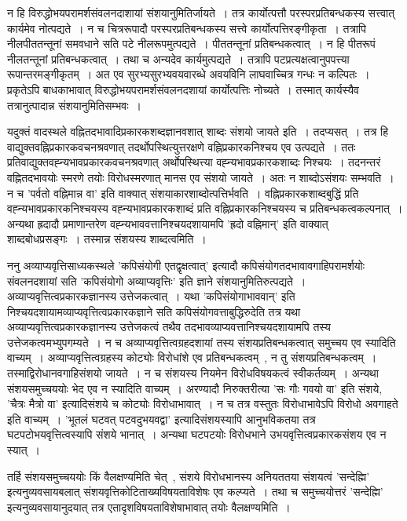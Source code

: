 		न हि विरुद्धोभयपरामर्शसंवलनदाशायां संशयानुमितिर्जायते~। तत्र कार्योत्पत्तौ परस्परप्रतिबन्धकस्य सत्त्वात् कार्यमेव नोत्पद्यते~। न च चित्ररूपादौ परस्परप्रतिबन्धकस्य सत्त्वे कार्योत्पत्तिरङ्गीकृता~। तत्रापि नीलपीततन्तूनां समवधाने सति पटे नीलरूपमुत्पद्यते~। पीततन्तूनां प्रतिबन्धकत्वात्~। न हि पीतरूपं नीलतन्तूनां प्रतिबन्धकत्वात्~। तथा च अन्यदेव कार्यमुत्पद्यते~। तत्रापि पटप्रत्यक्षत्वानुपपत्त्या रूपान्तरमङ्गीकृतम्~। अत एव सुरभ्यसुरभ्यवयवारब्धे अवयविनि लाघवाच्चित्र गन्धः न कल्पितः~। प्रकृतेऽपि बाधकाभावात् विरुद्धोभयपरामर्शसंवलनदशायां कार्योत्पत्तिः नोच्यते~। तस्मात् कार्यस्यैव तत्रानुत्पादान्न संशयानुमितिसम्भवः~।

		यदुक्तं वादस्थले वह्नितदभावादिप्रकारकशब्दज्ञानवशात् शाब्दः संशयो जायते इति~। तदप्यसत्~। तत्र हि वाद्युक्तवह्निप्रकारकवचनश्रवणात् तदर्थोपस्थित्युत्तरक्षणे वह्निप्रकारकनिश्चय एव उत्पद्यते~। ततः प्रतिवाद्युक्तवह्न्यभावप्रकारकवचनश्रवणात् अर्थोपस्थित्त्या वह्न्यभावप्रकारकशाब्दः निश्चयः~। तदनन्तरं वह्नितदभावयोः स्मरणे तयोः विरोधस्मरणात् मानस एव संशयो जायते~। अतः न शाब्दोऽसंशयः सम्भवति~। न च 'पर्वतो वह्निमान्न वा' इति वाक्यात् संशयाकारशाब्दोत्पत्तिर्भवति~। वह्निप्रकारकशाब्दबुद्धिं प्रति वह्न्यभावप्रकारकनिश्चयस्य वह्न्यभावप्रकारकशाब्दं प्रति वह्निप्रकारकनिश्चयस्य च प्रतिबन्धकत्वकल्पनात्~। अन्यथा  ह्रदादौ प्रमाणान्तरेण वह्न्यभाववत्तानिश्चयदशायामपि 'ह्रदो वह्निमान्' इति वाक्यात् शाब्दबोधप्रसङ्गः~। तस्मान्न संशयस्य शाब्दत्वमिति~।

		ननु अव्याप्यवृत्तिसाध्यकस्थले 'कपिसंयोगी एतद्वृक्षत्वात्' इत्यादौ कपिसंयोगतदभावावगाहिपरामर्शयोः संवलनदशायां सति 'कपिसंयोगो अव्याप्यवृत्तिः' इति ज्ञाने संशयानुमितिरुत्पद्यते~। अव्याप्यवृत्तित्वप्रकारकज्ञानस्य उत्तेजकत्वात्~। यथा 'कपिसंयोगाभाववान्' इति निश्चयदशायामव्याप्यवृत्तित्वप्रकारकज्ञाने सति कपिसंयोगवत्ताबुद्धिरुदेति तत्र यथा अव्याप्यवृत्तित्वप्रकारकज्ञानस्य उत्तेजकत्वं तथैव तदभावव्याप्यवत्तानिश्चयदशायामपि तस्य उत्तेजकत्वमभ्युपगम्यते~। न च अव्याप्यवृत्तित्वग्रहदशायां तस्य संशयप्रतिबन्धकत्वात् समुच्चय एव स्यादिति वाच्यम्~। अव्याप्यवृत्तित्वग्रहस्य कोट्योः विरोधांशे एव प्रतिबन्धकत्वम्~, न तु संशयप्रतिबन्धकत्वम्~। तस्माद्विरोधानवगाहिसंशयो जायते~। न च संशयस्य नियमेन विरोधविषयकत्वं स्वीकर्तव्यम्~। अन्यथा संशयसमुच्चययोः भेद एव न स्यादिति वाच्यम्~। अरण्यादौ निरुक्तरीत्या 'सः गौः गवयो वा' इति संशये, 'चैत्रः मैत्रो वा' इत्यादिसंशये च कोट्योः विरोधाभावात्~। न च तत्र वस्तुतः विरोधाभावेऽपि विरोधो अवगाहते इति वाच्यम्~। 'भूतलं घटवत् पटवदुभयवद्वा' इत्यादिसंशयस्यापि आनुभविकतया तत्र घटपटोभयवृत्तित्वस्यापि संशये भानात्~। अन्यथा घटपटयोः विरोधभाने उभयवृत्तित्वप्रकारकसंशय एव न स्यात्~। 

		तर्हि संशयसमुच्चययोः किं वैलक्षण्यमिति चेत्~, संशये विरोधभानस्य अनियततया संशयत्वं 'सन्देह्मि' इत्यनुव्यवसायबलात् संशयवृत्तिकोटिताख्यविषयताविशेषः एव कल्प्यते~। तथा च समुच्चयोत्तरं 'सन्देह्मि' इत्यनुव्यवसायानुदयात् तत्र एतादृशविषयताविशेषाभावात् तयोः वैलक्षण्यमिति~। 

